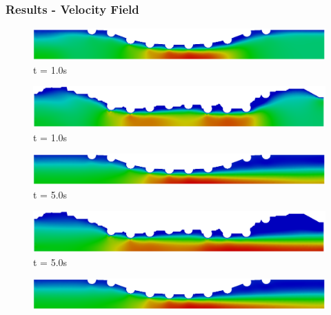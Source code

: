 \iffalse
\begin{frame}
 \frametitle{\LARGE Results - Velocity Field}

\vspace{-0.8cm}
\begin{figure}
     \begin{minipage}{.50\linewidth}
      \centering
      \includegraphics[scale=0.12]{images/vel_CurvedStrut3.png}\\
      \tiny t = 1.0s
     \end{minipage}%
     \begin{minipage}{.50\linewidth}
      \centering
      \includegraphics[scale=0.12]{images/vel_RealStrut3.png}\\
      \tiny t = 1.0s
     \end{minipage}
     \begin{minipage}{.50\linewidth}
     \smallskip
      \centering
      \includegraphics[scale=0.12]{images/vel_CurvedStrut5.png}\\
      \tiny t = 5.0s
     \end{minipage}%
     \begin{minipage}{.50\linewidth}
     \smallskip
      \centering
      \includegraphics[scale=0.12]{images/vel_RealStrut5.png}\\
      \tiny t = 5.0s
     \end{minipage}
     \begin{minipage}{.50\linewidth}
      \centering
      \includegraphics[scale=0.12]{images/vel_CurvedStrut8.png}\\

\end{minipage}
\end{figure}
\end{frame}
